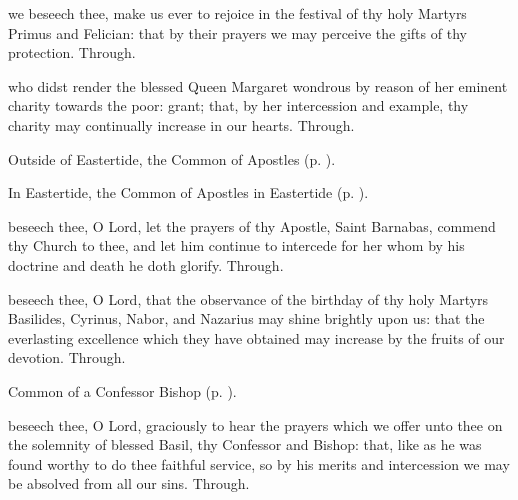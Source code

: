 \memorialCollect
{} we beseech thee, make us ever to rejoice in the festival of thy holy Martyrs Primus and Felician: that by their prayers we may perceive the gifts of thy protection. Through.



\memorialCollect
{} who didst render the blessed Queen Margaret wondrous by reason of her eminent charity towards the poor: grant; that, by her intercession and example, thy charity may continually increase in our hearts. Through.



\begin{rubric}
	Outside of Eastertide, the Common of Apostles (p. \pageref{CommonApostles}).
\end{rubric}

\begin{rubric}
	In Eastertide, the Common of Apostles in Eastertide (p. \pageref{CommonApostlesEaster}).
\end{rubric}

{} beseech thee, O Lord, let the prayers of thy Apostle, Saint Barnabas, commend thy Church to thee, and let him continue to intercede for her whom by his doctrine and death he doth glorify. Through.


\clearpage
{}

\memorialCollect
{} beseech thee, O Lord, that the observance of the birthday of thy holy Martyrs Basilides, Cyrinus, Nabor, and Nazarius may shine brightly upon us: that the everlasting excellence which they have obtained may increase by the fruits of our devotion. Through.



\begin{rubric}
	Common of a Confessor Bishop (p. \pageref{CommonConfessorBishop}).
\end{rubric}

{} beseech thee, O Lord, graciously to hear the prayers which we offer unto thee on the solemnity of blessed Basil, thy Confessor and Bishop: that, like as he was found worthy to do thee faithful service, so by his merits and intercession we may be absolved from all our sins. Through.


